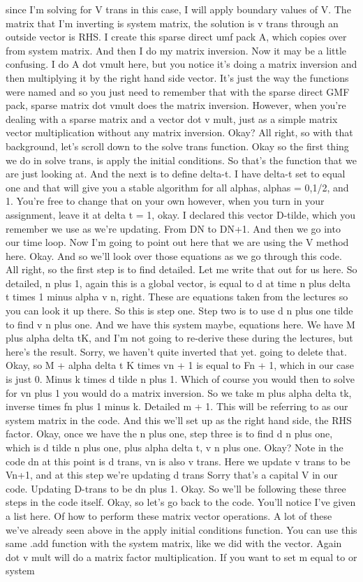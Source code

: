 \documentclass[10pt]{article}
\begin{document}
since I'm solving for V trans in this case, I will apply boundary values of V. The matrix that I'm inverting is system matrix, the solution is v trans through an outside vector is RHS. I create this sparse direct umf pack A, which copies over from system matrix. And then I do my matrix inversion. Now it may be a little confusing. I do A dot vmult here, but you notice it's doing a matrix inversion and then multiplying it by the right hand side vector. It's just the way the functions were named and so you just need to remember that with the sparse direct GMF pack, sparse matrix dot vmult does the matrix inversion. However, when you're dealing with a sparse matrix and a vector dot v mult, just as a simple matrix vector multiplication without any matrix inversion. Okay? All right, so with that background, let's scroll down to the solve trans function. Okay so the first thing we do in solve trans, is apply the initial conditions. So that's the function that we are just looking at. And the next is to define delta-t. I have delta-t set to equal one and that will give you a stable algorithm for all alphas, alphas = 0,1/2, and 1. You're free to change that on your own however, when you turn in your assignment, leave it at delta t = 1, okay. I declared this vector D-tilde, which you remember we use as we're updating. From DN to DN+1. And then we go into our time loop. Now I'm going to point out here that we are using the V method here. Okay. And so we'll look over those equations as we go through this code. All right, so the first step is to find detailed. Let me write that out for us here. So detailed, n plus 1, again this is a global vector, is equal to d at time n plus delta t times 1 minus alpha v n, right. These are equations taken from the lectures so you can look it up there. So this is step one. Step two is to use d n plus one tilde to find v n plus one. And we have this system maybe, equations here. We have M plus alpha delta tK, and I'm not going to re-derive these during the lectures, but here's the result. Sorry, we haven't quite inverted that yet. going to delete that. Okay, so M + alpha delta t K times vn + 1 is equal to Fn + 1, which in our case is just 0. Minus k times d tilde n plus 1. Which of course you would then to solve for vn plus 1 you would do a matrix inversion. So we take m plus alpha delta tk, inverse times fn plus 1 minus k. Detailed m + 1. This will be referring to as our system matrix in the code. And this we'll set up as the right hand side, the RHS factor. Okay, once we have the n plus one, step three is to find d n plus one, which is d tilde n plus one, plus alpha delta t, v n plus one. Okay? Note in the code dn at this point is d trans, vn is also v trans. Here we update v trans to be Vn+1, and at this step we're updating d trans Sorry that's a capital V in our code. Updating D-trans to be dn plus 1. Okay. So we'll be following these three steps in the code itself. Okay, so let's go back to the code. You'll notice I've given a list here. Of how to perform these matrix vector operations. A lot of these we've already seen above in the apply initial conditions function. You can use this same .add function with the system matrix, like we did with the vector. Again dot v mult will do a matrix factor multiplication. If you want to set m equal to or system 
\end{document}
